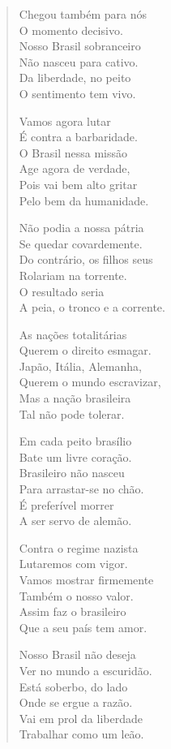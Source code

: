 \begin{verse}
Chegou também para nós\\
O momento decisivo.\\
Nosso Brasil sobranceiro\\
Não nasceu para cativo.\\
Da liberdade, no peito\\
O sentimento tem vivo.

Vamos agora lutar\\
É contra a barbaridade.\\
O Brasil nessa missão\\
Age agora de verdade,\\
Pois vai bem alto gritar\\
Pelo bem da humanidade.

Não podia a nossa pátria\\
Se quedar covardemente.\\
Do contrário, os filhos seus\\
Rolariam na torrente.\\
O resultado seria\\
A peia, o tronco e a corrente.


As nações totalitárias\\
Querem o direito esmagar.\\
Japão, Itália, Alemanha,\\
Querem o mundo escravizar,\\
Mas a nação brasileira\\
Tal não pode tolerar.

Em cada peito brasílio\\
Bate um livre coração.\\
Brasileiro não nasceu\\
Para arrastar-se no chão.\\
É preferível morrer\\
A ser servo de alemão.

Contra o regime nazista\\
Lutaremos com vigor.\\
Vamos mostrar firmemente\\
Também o nosso valor.\\
Assim faz o brasileiro\\
Que a seu país tem amor.

Nosso Brasil não deseja\\
Ver no mundo a escuridão.\\
Está soberbo, do lado\\
Onde se ergue a razão.\\
Vai em prol da liberdade\\
Trabalhar como um leão.



\end{verse}
